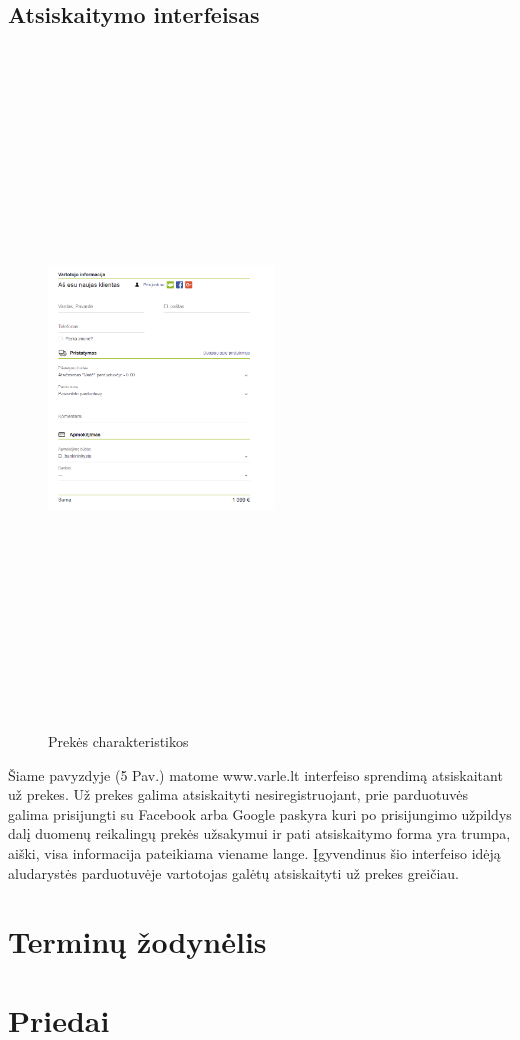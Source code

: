 \documentclass[oneside]{VUMIFPSkursinis}
\begin{document}
	
	\subsection{Atsiskaitymo interfeisas}
		\begin{figure}[h]
			\centering
			\includegraphics[width=6cm,height=18cm,keepaspectratio]{IkvepiantisInterfeisas5.png}
			\caption{ Prekės charakteristikos}
		\end{figure}

			Šiame pavyzdyje (5 Pav.) matome www.varle.lt interfeiso sprendimą atsiskaitant už prekes. 
			Už prekes galima atsiskaityti nesiregistruojant, prie parduotuvės galima prisijungti su Facebook arba Google paskyra kuri po prisijungimo užpildys dalį duomenų reikalingų prekės užsakymui ir pati atsiskaitymo forma yra trumpa, aiški, visa informacija pateikiama viename lange. 
			Įgyvendinus šio interfeiso idėją aludarystės parduotuvėje vartotojas galėtų atsiskaityti už prekes greičiau.


\section{Terminų žodynėlis}
\section{Priedai}
\end{document}
